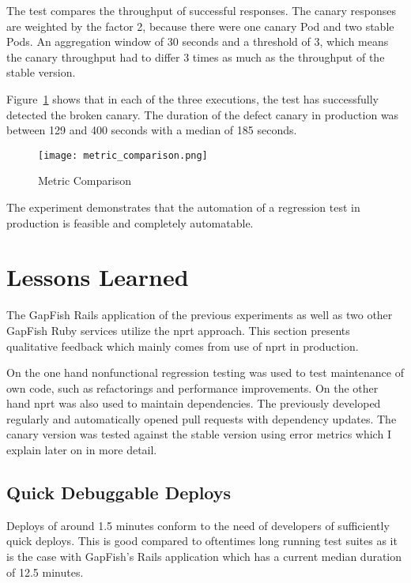 The test compares the throughput of successful responses. The canary responses are weighted by
the factor 2, because there were one canary Pod and two stable Pods. An aggregation window
of 30 seconds and a threshold of 3, which means the canary throughput had to differ 3 times
as much as the throughput of the stable version.

Figure~\ref{fig:metric_comparison} shows that in each of the three executions, the test
has successfully detected the broken canary. The duration of the defect canary in
production was between 129 and 400 seconds with a median of 185 seconds.

\begin{figure}[htbp]
  \centering
  \texttt{[image: metric\_comparison.png]}
  \caption{Metric Comparison}
  \label{fig:metric_comparison}
\end{figure}

The experiment demonstrates that the automation of a regression test in production is
feasible and completely automatable.

\section{Lessons Learned}

The GapFish Rails application of the previous experiments as well as two other
GapFish Ruby services utilize the \gls{nprt} approach. This section presents
qualitative feedback which mainly comes from use of \gls{nprt} in production.

On the one hand nonfunctional regression testing was used to test maintenance of own code,
such as refactorings and performance improvements. On the other hand \gls{nprt} was also
used to maintain dependencies. The previously developed \gemupdater{} regularly and
automatically opened pull requests with dependency updates. The canary version was tested against the stable version using
error metrics which I explain later on in more detail.

\subsection{Quick Debuggable Deploys}

Deploys of around 1.5 minutes conform to the need of developers of sufficiently quick
deploys. This is good compared to oftentimes long running test suites as it is the case with
GapFish's Rails application which has a current median duration of 12.5 minutes.

